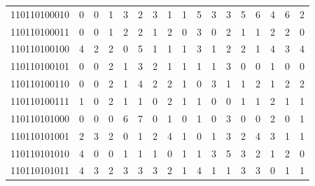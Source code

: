 \documentclass[10pt,a4paper]{article}
\begin{document}
\begin{longtable}{ |c|c|c|c|c|c|c|c|c|c|c|c|c|c|c|c|c| }
    110110100010              & 0                            & 0                                & 1                            & 3                              & 2   & 3   & 1   & 1   & 5   & 3   & 3   & 5   & 6   & 4   & 6   & 2   \\
    110110100011              & 0                            & 0                                & 1                            & 2                              & 2   & 1   & 2   & 0   & 3   & 0   & 2   & 1   & 1   & 2   & 2   & 0   \\
    110110100100              & 4                            & 2                                & 2                            & 0                              & 5   & 1   & 1   & 1   & 3   & 1   & 2   & 2   & 1   & 4   & 3   & 4   \\
    110110100101              & 0                            & 0                                & 2                            & 1                              & 3   & 2   & 1   & 1   & 1   & 1   & 3   & 0   & 0   & 1   & 0   & 0   \\
    110110100110              & 0                            & 0                                & 2                            & 1                              & 4   & 2   & 2   & 1   & 0   & 3   & 1   & 1   & 2   & 1   & 2   & 2   \\
    110110100111              & 1                            & 0                                & 2                            & 1                              & 1   & 0   & 2   & 1   & 1   & 0   & 0   & 1   & 1   & 2   & 1   & 1   \\
    110110101000              & 0                            & 0                                & 0                            & 6                              & 7   & 0   & 1   & 0   & 1   & 0   & 3   & 0   & 0   & 2   & 0   & 1   \\
    110110101001              & 2                            & 3                                & 2                            & 0                              & 1   & 2   & 4   & 1   & 0   & 1   & 3   & 2   & 4   & 3   & 1   & 1   \\
    110110101010              & 4                            & 0                                & 0                            & 1                              & 1   & 1   & 0   & 1   & 1   & 3   & 5   & 3   & 2   & 1   & 2   & 0   \\
    110110101011              & 4                            & 3                                & 2                            & 3                              & 3   & 3   & 2   & 1   & 4   & 1   & 1   & 3   & 3   & 0   & 1   & 1   \\

\end{longtable}
\end{document}
